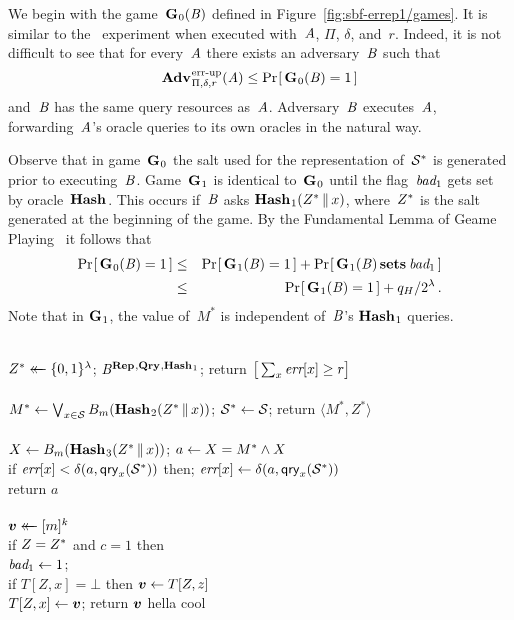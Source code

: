 We begin with the game~$\textup{\textbf{G}}\hspace{0.5pt}_0(\mathit{B})$ defined in
Figure~\ref{fig:sbf-errep1/games}. It is similar to the \errep\ experiment when
executed with~$\mathit{A}$, $\Pi$, $\delta$, and~$r$. Indeed, it is not difficult to
see that for every~$\mathit{A}$ there exists an adversary~$\mathit{B}$ such that
\begin{equation}
  \Adv{\errep}_{\Pi,\delta,r}(\advA) \leq \Prob{\game_0(\advB) = 1}
\end{equation}
and~$\mathit{B}$ has the same query resources as~$\mathit{A}$.
%
Adversary~$\mathit{B}$ executes~$\mathit{A}$, forwarding~$\mathit{A}$'s oracle queries
to its own oracles in the natural way.

Observe that in game~$\textup{\textbf{G}}\hspace{0.5pt}_0$ the salt used for the representation of~$\mathcal{S}^*$
is generated prior to executing~$\mathit{B}$. Game~$\textup{\textbf{G}}\hspace{0.5pt}_1$ is identical
to~$\textup{\textbf{G}}\hspace{0.5pt}_0$ until the flag~$\textit{bad}_1$ gets set by oracle~$\textup{\textbf{Hash}}\hspace{0.5pt}$. This occurs
if~$\mathit{B}$ asks $\textup{\textbf{Hash}}\hspace{0.5pt}_1(Z^* \, \| \, x)$, where~$Z^*$ is the salt generated
at the beginning of the game.
%
By the Fundamental Lemma of Geame Playing~\cite{bellare2006triple} it follows
that
%
\begin{eqnarray}
  \Pr\hspace{-1pt}\left[\,\textup{\textbf{G}}\hspace{0.5pt}_0(\mathit{B})=1\,\right] &\leq&
    \Pr\hspace{-1pt}\left[\,\textup{\textbf{G}}\hspace{0.5pt}_1(\mathit{B})=1\,\right] + \Pr\hspace{-1pt}\left[\,\textup{\textbf{G}}\hspace{0.5pt}_1(\mathit{B}) \,\textup{\textbf{sets}}\hspace{0.5pt}\, \textit{bad}_1\,\right]\\
  &\leq&
    \Pr\hspace{-1pt}\left[\,\textup{\textbf{G}}\hspace{0.5pt}_1(\mathit{B})=1\,\right] + q_H/2^\lambda \,.
\end{eqnarray}
%
Note that in $\textup{\textbf{G}}\hspace{0.5pt}_1$, the value of~$M^*$ is independent of~$\mathit{B}$'s
$\textup{\textbf{Hash}}\hspace{0.5pt}_1$ queries.


\begin{figure*}
{
  \vspace{-7pt}
      \hfill {}\\[2pt]
    $Z^* \mathrel{\leftarrow\mkern-14mu\leftarrow} \{0,1\}^\lambda$;
    $\mathit{B}^{\textup{\textbf{Rep}}\hspace{0.5pt},\textup{\textbf{Qry}}\hspace{0.5pt},\textup{\textbf{Hash}}\hspace{0.5pt}_1}$;
    return $\big[\sum_x \textit{err}[x] \geq r\big]$
  \\[6pt]
  \oraclev{$\REPO(\col)$}\\[2pt]
    $M^* \gets \bigvee_{x \in \mathcal{S}} {B}_m(\textup{\textbf{Hash}}\hspace{0.5pt}_2(Z^* \, \| \, x))$;
    $\mathcal{S}^* \gets \mathcal{S}$;
    return $\langle M^*, Z^* \rangle$
  \\[6pt]
  \\[2pt]
    $X \gets {B}_m(\textup{\textbf{Hash}}\hspace{0.5pt}_3(Z^* \, \| \, x))$;
    $a \gets X = M^* \wedge X$\\
    if $\textit{err}[x] < \delta(a,\mathsf{qry}_x(\mathcal{S}^*))$ then;
          $\textit{err}[x] \gets \delta(a,\mathsf{qry}_x(\mathcal{S}^*))$\\
    return $a$
  \\[6pt]
  \\[2pt]
    $\boldsymbol{v} \mathrel{\leftarrow\mkern-14mu\leftarrow} [m]^k$\\
    if $Z=Z^*$ and $c=1$ then \\
    \tab $\textit{bad}_1 \gets 1$; \\
    if $T[Z,x] = \bot$ then $\boldsymbol{v} \gets T[Z,z]$\\
    $T[Z,x] \gets \boldsymbol{v}$; return $\boldsymbol{v}$
}
{
  hella
}
{
  cool
}
\caption{Games for proof of Theorem~\ref{thm:sbf-errep1}.}
\label{fig:sbf-errep1/games}
\end{figure*}

